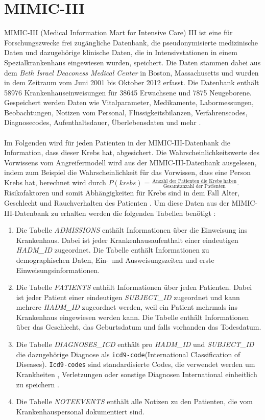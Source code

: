 \documentclass[german,version-2020-11]{uzl-thesis}
\begin{document}
\section{MIMIC-III}
MIMIC-III (Medical Information Mart for Intensive Care) III ist eine für Forschungszwecke frei zugängliche Datenbank, die pseudonymisierte medizinische Daten und dazugehörige klinische Daten, die in Intensivstationen in einem Spezialkrankenhaus eingewiesen wurden, speichert. Die Daten stammen dabei aus dem \textit{Beth Israel Deaconess Medical Center} in Boston, Massachusetts und wurden in dem Zeitraum vom Juni 2001 bis Oktober 2012 erfasst. Die Datenbank enthält 58976 Krankenhauseinweisungen für 38645 Erwachsene und 7875 Neugeborene. Gespeichert werden Daten wie Vitalparameter, Medikamente, Labormessungen, Beobachtungen, Notizen vom Personal, Flüssigkeitsbilanzen, Verfahrenscodes, Diagnosecodes, Aufenthaltsdauer, Überlebensdaten und mehr \cite{12}.  \\ \\ 
Im Folgenden wird für jeden Patienten in der MIMIC-III-Datenbank die Information, dass dieser Krebs hat, abgesichert. Die Wahrscheinlichkeitswerte des Vorwissens vom Angreifermodell wird aus der MIMIC-III-Datenbank ausgelesen, indem zum Beispiel die Wahrscheinlichkeit für das Vorwissen, dass eine Person Krebs hat, berechnet wird durch $
P(krebs) =  \frac{\text{Anzahl der Patienten die Krebs haben}}{\text{Gesamtanzahl der Patienten}}$. \\ 
Risikofaktoren und somit Abhängigkeiten für Krebs sind in dem Fall Alter, Geschlecht und Rauchverhalten des Patienten \cite{13,14}. Um diese Daten aus der MIMIC-III-Datenbank zu erhalten werden die folgenden Tabellen benötigt : 
\begin{enumerate}
	\item Die Tabelle \textit{ADMISSIONS} enthält Informationen über die Einweisung ins Krankenhaus. Dabei ist jeder Krankenhausaufenthalt einer eindeutigen \textit{HADM\_ID} zugeordnet. Die Tabelle enthält Informationen zu demographischen Daten, Ein- und Ausweisungszeiten und erste Einweisungsinformationen.
	\item Die Tabelle \textit{PATIENTS} enthält Informationen über jeden Patienten. Dabei ist jeder Patient einer eindeutigen \textit{SUBJECT\_ID} zugeordnet und kann mehrere \textit{HADM\_ID} zugeordnet werden, weil ein Patient mehrmals ins Krankenhaus eingewiesen werden kann. Die Tabelle enthält Informationen über das Geschlecht, das Geburtsdatum und falls vorhanden das Todesdatum.
	\item Die Tabelle \textit{DIAGNOSES\_ICD} enthält pro \textit{HADM\_ID} und \textit{SUBJECT\_ID} die dazugehörige Diagnose als \texttt{icd9-code}(International Classification of Diseases). \texttt{Icd9-codes} sind standardisierte Codes, die verwendet  werden um Krankheiten , Verletzungen oder sonstige Diagnosen International einheitlich zu speichern \cite{15}.
	\item Die Tabelle \textit{NOTEEVENTS} enthält alle Notizen zu den Patienten, die vom Krankenhauspersonal dokumentiert sind.
\end{enumerate} 
\end{document}
